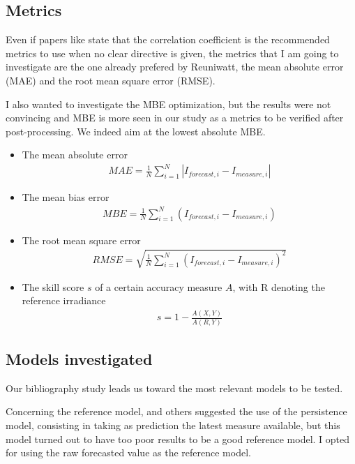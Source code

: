 \subsection{Metrics}
Even if papers like \cite{mayer_calibration_2023} state that the correlation coefficient is the recommended metrics to use when no clear directive is given, the metrics 
that I am going to investigate are the one already prefered by Reuniwatt, the mean absolute error (MAE) and the root mean square error (RMSE). 

I also wanted to investigate the MBE optimization, but the results were not convincing and MBE is more seen in our study as a metrics to be verified after post-processing.
We indeed aim at the lowest absolute MBE.

\begin{itemize}
    \item The mean absolute error \begin{align*}
        MAE = \frac{1}{N} \sum_{i=1}^{N} | I_{forecast, i} - I_{measure, i} |
    \end{align*}

    \item The mean bias error \begin{align*}
        MBE = \frac{1}{N} \sum_{i=1}^{N} ( I_{forecast, i} - I_{measure, i} )
    \end{align*}

    \item The root mean square error \begin{align*}
        RMSE = \sqrt{\frac{1}{N} \sum_{i=1}^{N} ( I_{forecast, i} - I_{measure, i} ) ^{2}}
    \end{align*}

    \item The skill score $s$  of a certain accuracy measure $A$, with R denoting the reference irradiance
    \begin{align*}
        s = 1 - \frac{A(X,Y)}{A(R,Y)}
    \end{align*}
\end{itemize}

\subsection{Models investigated}\label{subsec:models}
Our bibliography study leads us toward the most relevant models to be tested.

Concerning the reference model, \cite{lorenz_benchmarking_nodate} and others suggested the use of the persistence model, consisting in taking as prediction the latest measure available,
but this model turned out to have too poor results to be a good reference model. I opted for using the raw forecasted value as the reference model.

